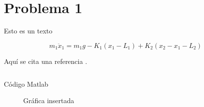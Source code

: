 \section{Problema 1}

Esto es un texto

\begin{equation}
  m_{1}\ddot x_{1} = m_{1}g - K_{1}\left(x_{1} - L_{1}\right) + K_{2}
                \left(x_{2} - x_{1} - L_{2}\right)
  \label{eq:p1_edo1}
\end{equation}

Aquí se cita una referencia \cite{apunte-sld}.

\begin{listing}[!ht]
  \inputminted[firstline=1,lastline=17]{Matlab}{matlab/r.m}
  \caption{Código Matlab}
  \label{lst:matlab}
\end{listing}

\begin{figure}[h!]
  \centering
  
  \caption{Gráfica insertada}
  \label{fig:grafica}
\end{figure}
\FloatBarrier

\FloatBarrier
\newpage
